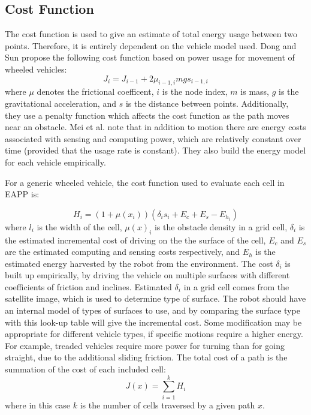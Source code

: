 \documentclass[journal]{IEEEtran}
\begin{document}
\subsection{Cost Function}
The cost function is used to give an estimate of total energy usage between two points. 
Therefore, it is entirely dependent on the vehicle model used. Dong and Sun \cite{minimizing energy consumption of wheeled mobile robots ...} propose the following cost function based on power usage for movement of wheeled vehicles:
\begin{equation}
J_i = J_{i-1} + 2\mu_{i-1,i}mg s_{i-1,i}
\end{equation}
where $\mu$ denotes the frictional coefficent, $i$ is the node index, $m$ is mass, $g$ is the gravitational acceleration, and $s$ is the distance between points. 
Additionally, they use a penalty function which affects the cost function as the path moves near an obstacle.
Mei et al. \cite{Mei - deployment} note that in addition to motion there are energy costs associated with sensing and computing power, which are relatively constant over time (provided that the usage rate is constant).
They also build the energy model for each vehicle empirically.

For a generic wheeled vehicle, the cost function used to evaluate each cell in EAPP is:

\begin{equation}
H_i = (1 + \mu(x_i))(\delta_i s_{i} + E_c + E_s - E_{h_i})
\end{equation}
where $l_i$ is the width of the cell, $\mu(x)_i$ is the obstacle density in a grid cell, $\delta_i$ is the estimated incremental cost of driving on the the surface of the cell, $E_c$ and $E_s$ are the estimated computing and sensing costs respectively, and $E_h$ is the estimated energy harvested by the robot from the environment. 
The cost $\delta_i$ is built up empirically, by driving the vehicle on multiple surfaces with different coefficients of friction and inclines.
Estimated $\delta_i$ in a grid cell comes from the satellite image, which is used to determine type of surface. 
The robot should have an internal model of types of surfaces to use, and by comparing the surface type with this  look-up table will give the incremental cost.
Some modification may be appropriate for different vehicle types, if specific motions require a higher energy. 
For example, treaded vehicles require more power for turning than for going straight, due to the additional sliding friction.
The total cost of a path is the summation of the cost of each included cell: 
\begin{equation}
J(x) = \sum_{i=1}^k H_i
\end{equation}
where in this case $k$ is the number of cells traversed by a given path $x$.
\end{document}
